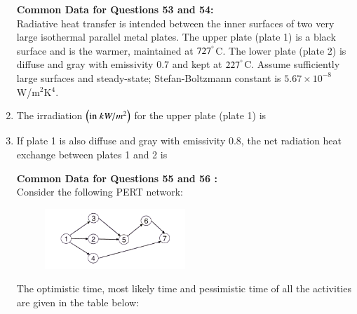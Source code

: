 \documentclass[journal]{IEEEtran}
\begin{document}
\begin{enumerate}[leftmargin=0pt]
\textbf{Common Data for Questions 53 and 54:}\\
Radiative heat transfer is intended between the inner surfaces of two very large isothermal parallel metal plates. The upper plate (plate 1) is a black surface and is the warmer, maintained at $727^{\degree}$C. The lower plate (plate 2) is diffuse and gray with emissivity 0.7 and kept at $227^{\degree}$C. Assume sufficiently large surfaces and steady-state; Stefan-Boltzmann constant is $5.67 \times 10^{-8}$ W/m$^2$K$^4$.
\item The irradiation $\left(\text{in}\  kW/m^2\right)$ for the upper plate (plate 1) is
\begin{enumerate}
\hfill{}
\end{enumerate}
\item If plate 1 is also diffuse and gray with emissivity 0.8, the net radiation heat exchange  between plates 1 and 2 is
\begin{enumerate}
\hfill{}
\end{enumerate}
\textbf{Common Data for Questions 55 and 56 :}\\
Consider the following PERT network:
\begin{figure}[h]
  \centering
  \includegraphics[width=0.5\textwidth]{Figs/image (12).png}
  \caption{}
  \label{fig:54}
\end{figure}
The optimistic time, most likely time and pessimistic time of all the activities are given in the table below:\\
\begin{table}[h]
    \centering
    
   

\end{table}
\end{enumerate}
\end{document}
